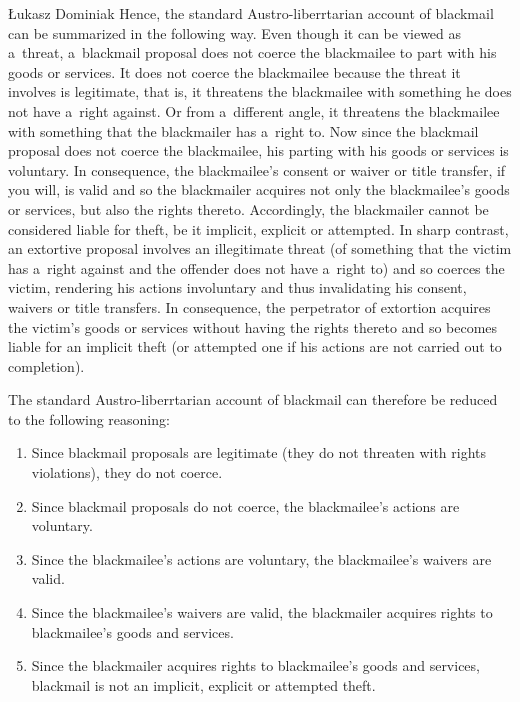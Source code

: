 \begin{artengenv}{Łukasz Dominiak}
Hence, the standard Austro-liberrtarian account of blackmail can be summarized in the following way. Even though it can be viewed as a~threat, a~blackmail proposal does not coerce the blackmailee to part with his goods or services. It does not coerce the blackmailee because the threat it involves is legitimate, that is, it threatens the blackmailee with something he does not have a~right against. Or from a~different angle, it threatens the blackmailee with something that the blackmailer has a~right to. Now since the blackmail proposal does not coerce the blackmailee, his parting with his goods or services is voluntary. In consequence, the blackmailee's consent or waiver or title transfer, if you will, is valid and so the blackmailer acquires not only the blackmailee's goods or services, but also the rights thereto. Accordingly, the blackmailer cannot be considered liable for theft, be it implicit, explicit or attempted. In sharp contrast, an extortive proposal involves an illegitimate threat (of something that the victim has a~right against and the offender does not have a~right to) and so coerces the victim, rendering his actions involuntary and thus invalidating his consent, waivers or title transfers. In consequence, the perpetrator of extortion acquires the victim's goods or services without having the rights thereto and so becomes liable for an implicit theft (or attempted one if his actions are not carried out to completion).



The standard Austro-liberrtarian account of blackmail can therefore be reduced to the following reasoning:



\begin{enumerate}

\item Since blackmail proposals are legitimate (they do not threaten with rights violations), they do not coerce.

\item Since blackmail proposals do not coerce, the blackmailee's actions are voluntary.

\item Since the blackmailee's actions are voluntary, the blackmailee's waivers are valid.

\item Since the blackmailee's waivers are valid, the blackmailer acquires rights to blackmailee's goods and services.

\item Since the blackmailer acquires rights to blackmailee's goods and services, blackmail is not an implicit, explicit or attempted theft.


\end{enumerate}
\end{artengenv}
